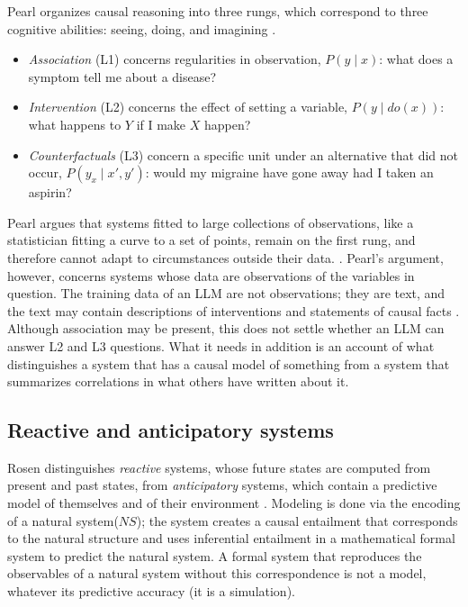 \documentclass{llncs}
\begin{document}
Pearl organizes causal reasoning into three rungs, which correspond to three cognitive abilities: seeing, doing, and imagining \cite{pearl2009causality,pearl2018bookOfWhy}. 
\begin{itemize}
    \item \textit{Association} (L1) concerns regularities in observation, $P(y \mid x)$: what does a symptom tell me about a disease? 
    \item \textit{Intervention} (L2) concerns the effect of setting a variable, $P(y \mid do(x))$: what happens to $Y$ if I make $X$ happen? 
    \item \textit{Counterfactuals} (L3) concern a specific unit under an alternative that did not occur, $P(y_x \mid x', y')$: would my migraine have gone away had I taken an aspirin?
\end{itemize}
 Pearl argues that systems fitted to large collections of observations, like a statistician fitting a curve to a set of points, remain on the first rung, and therefore cannot adapt to circumstances outside their data. \cite{pearl2018theoretical,pearl2018bookOfWhy}. Pearl's argument, however, concerns systems whose data are observations of the variables in question. The training data of an LLM are not observations; they are text, and the text may contain descriptions of interventions and statements of causal facts \cite{Zecevic2023CausalPL}. Although association may be present, this does not settle whether an LLM can answer L2 and L3 questions. What it needs in addition is an account of what distinguishes a system that has a causal model of something from a system that summarizes correlations in what others have written about it. 

\subsection{Reactive and anticipatory systems}
\label{sec:rosen}

Rosen distinguishes \emph{reactive} systems, whose future states are computed from present and past states, from \emph{anticipatory} systems, which contain a predictive model of themselves and of their environment \cite{rosen2012anticipatory}. Modeling is done via the encoding of a natural system($NS$); the system creates a causal entailment that corresponds to the natural structure and uses inferential entailment in a mathematical formal system to predict the natural system. A formal system that reproduces the observables of a natural system without this correspondence is not a model, whatever its predictive accuracy (it is a simulation).
\end{document}
